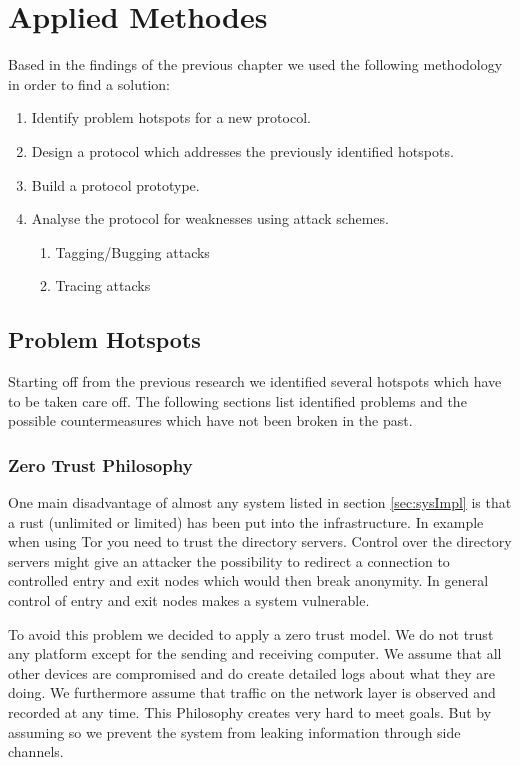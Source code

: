 \chapter{Applied Methodes}
Based in the findings of the previous chapter we used the following methodology in order to find a solution:
\begin{enumerate}
	\item Identify problem hotspots for a new protocol.
	\item Design a protocol which addresses the previously identified hotspots.
	\item Build a protocol prototype.
	\item Analyse the protocol for weaknesses using attack schemes.
	\begin{enumerate}
		\item Tagging/Bugging attacks
		\item Tracing attacks
	\end{enumerate}
\end{enumerate}

\section{Problem Hotspots}
Starting off from the previous research we identified several hotspots which have to be taken care off. The following sections list identified problems and the possible countermeasures which have not been broken in the past.


\subsection{Zero Trust Philosophy}
One main disadvantage of almost any system listed in section \ref{sec:sysImpl} is that a rust (unlimited or limited) has been put into the infrastructure. In example when using Tor you need to trust the directory servers. Control over the directory servers might give an attacker the possibility to redirect a connection to controlled entry and exit nodes which would then break anonymity. In general control of entry and exit nodes makes a system vulnerable. 

To avoid this problem we decided to apply a zero trust model. We do not trust any platform except for the sending and receiving computer. We assume that all other devices are compromised and do create detailed logs about what they are doing. We furthermore assume that traffic on the network layer is observed and recorded at any time. This Philosophy creates very hard to meet goals. But by assuming so we prevent the system from leaking information through side channels.

